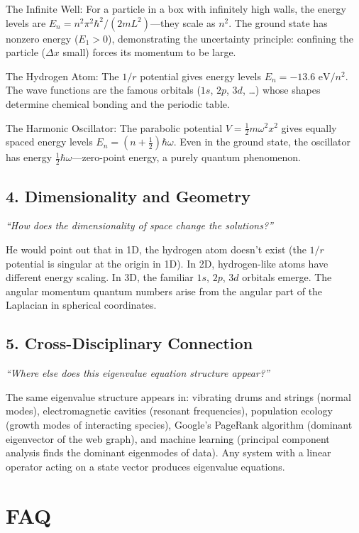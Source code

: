\documentclass[11pt,openright]{book}
\begin{document}
The Infinite Well: For a particle in a box with infinitely high walls, the energy levels are $E_n = n^2 \pi^2 \hbar^2 / (2mL^2)$---they scale as $n^2$. The ground state has nonzero energy ($E_1 > 0$), demonstrating the uncertainty principle: confining the particle ($\Delta x$ small) forces its momentum to be large.

The Hydrogen Atom: The $1/r$ potential gives energy levels $E_n = -13.6 \text{ eV}/n^2$. The wave functions are the famous orbitals ($1s$, $2p$, $3d$, \ldots) whose shapes determine chemical bonding and the periodic table.

The Harmonic Oscillator: The parabolic potential $V = \frac{1}{2}m\omega^2 x^2$ gives equally spaced energy levels $E_n = (n + \frac{1}{2})\hbar\omega$. Even in the ground state, the oscillator has energy $\frac{1}{2}\hbar\omega$---zero-point energy, a purely quantum phenomenon.

\subsection*{4. Dimensionality and Geometry}
\textit{``How does the dimensionality of space change the solutions?''}

He would point out that in 1D, the hydrogen atom doesn't exist (the $1/r$ potential is singular at the origin in 1D). In 2D, hydrogen-like atoms have different energy scaling. In 3D, the familiar $1s$, $2p$, $3d$ orbitals emerge. The angular momentum quantum numbers arise from the angular part of the Laplacian in spherical coordinates.

\subsection*{5. Cross-Disciplinary Connection}
\textit{``Where else does this eigenvalue equation structure appear?''}

The same eigenvalue structure appears in: vibrating drums and strings (normal modes), electromagnetic cavities (resonant frequencies), population ecology (growth modes of interacting species), Google's PageRank algorithm (dominant eigenvector of the web graph), and machine learning (principal component analysis finds the dominant eigenmodes of data). Any system with a linear operator acting on a state vector produces eigenvalue equations.
\section*{FAQ}
\end{document}
